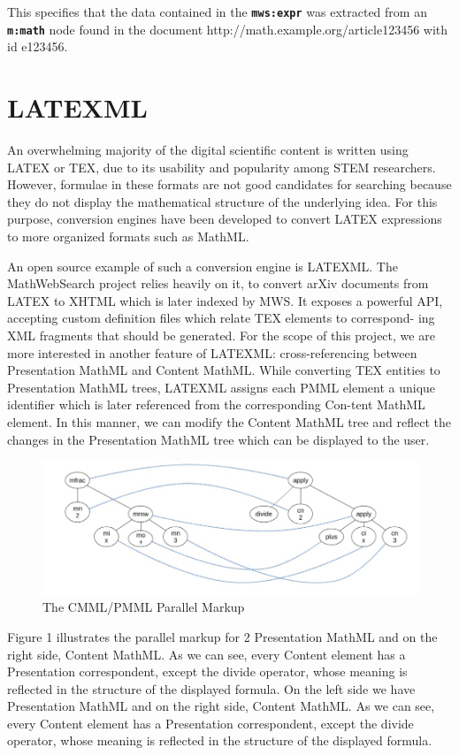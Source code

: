 \documentclass{deliverablereport}
\begin{document}
This specifies that the data contained in the \textbf{\texttt{mws:expr}} was extracted from an \textbf{\texttt{m:math}} node found in the document http://math.example.org/article123456 with id e123456.

\section{LATEXML}\label{sec:ml}
An overwhelming majority of the digital scientific content is written using LATEX or TEX,
due to its usability and popularity among STEM researchers. However, formulae in these
formats are not good candidates for searching because they do not display the mathematical
structure of the underlying idea. For this purpose, conversion engines have been developed
to convert LATEX expressions to more organized formats such as MathML.

An open source example of such a conversion engine is LATEXML. The MathWebSearch project
relies heavily on it, to convert arXiv documents from LATEX to XHTML which is later
indexed by MWS. It exposes a powerful API, accepting custom definition files which relate
TEX elements to correspond- ing XML fragments that should be generated. For the scope of
this project, we are more interested in another feature of LATEXML: cross-referencing
between Presentation MathML and Content MathML. While converting TEX entities to
Presentation MathML trees, LATEXML assigns each PMML element a unique identifier which is
later referenced from the corresponding Con-tent MathML element. In this manner, we can
modify the Content MathML tree and reflect the changes in the Presentation MathML tree
which can be displayed to the user.
 

\begin{figure}[h]
\centering
 \includegraphics[scale=0.8]{figure2.jpg}
 \caption{The CMML/PMML Parallel Markup}
\end{figure}

Figure 1 illustrates the parallel markup for 2 Presentation MathML and on the right side,
Content MathML. As we can see, every Content element has a Presentation correspondent,
except the divide operator, whose meaning is reflected in the structure of the displayed
formula. On the left side we have Presentation MathML and on the right side, Content
MathML. As we can see, every Content element has a Presentation correspondent, except the
divide operator, whose meaning is reflected in the structure of the displayed formula.
\end{document}
